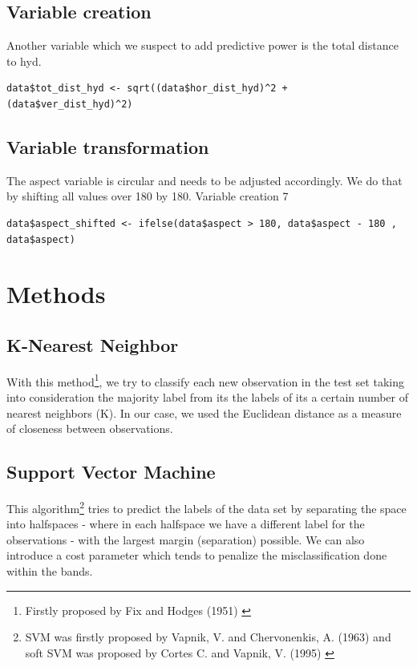 \documentclass[paper=a4, fontsize=12pt]{scrartcl}
\numberwithin{equation}{section}
\numberwithin{figure}{section}
\numberwithin{table}{section}
\begin{document}
\subsection{Variable creation}
Another variable which we suspect to add predictive power is the total distance to hyd.\\
\begin{lstlisting}
data$tot_dist_hyd <- sqrt((data$hor_dist_hyd)^2 + (data$ver_dist_hyd)^2)
\end{lstlisting}

\subsection{Variable transformation}
The aspect variable is circular and needs to be adjusted accordingly. We do that by shifting all values over 180 by 180.
Variable creation 7
\begin{lstlisting}
data$aspect_shifted <- ifelse(data$aspect > 180, data$aspect - 180 , data$aspect)
\end{lstlisting}





\newpage




\section{Methods}
\subsection{K-Nearest Neighbor}
With this method\footnote{Firstly proposed by Fix and Hodges (1951) \cite{knn}}, we try to classify each new observation in the test set taking into consideration the majority label from its the labels of its a certain number of nearest neighbors (K). In our case, we used the Euclidean distance as a measure of closeness between observations.


\subsection{Support Vector Machine}
This algorithm\footnote{ SVM was firstly proposed by  Vapnik, V. and Chervonenkis, A. (1963) and soft SVM was proposed by  Cortes C. and Vapnik, V. (1995) \cite{vap}}  tries to predict the labels of the data set by separating the space into halfspaces - where in each halfspace we have a different label for the observations - with the largest margin (separation) possible. We can also introduce a cost parameter which tends to penalize the misclassification done within the bands. 
\end{document}
